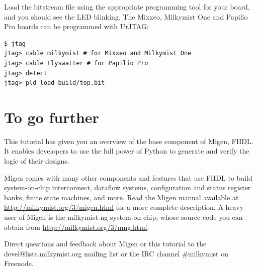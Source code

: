 \documentclass[11pt]{paper}
\begin{document}
Load the bitstream file using the appropriate programming tool for your board, and you should see the LED blinking. The Mixxeo, Milkymist One and Papilio Pro boards can be programmed with UrJTAG:

\begin{verbatim}
$ jtag
jtag> cable milkymist # for Mixxeo and Milkymist One
jtag> cable Flyswatter # for Papilio Pro
jtag> detect
jtag> pld load build/top.bit
\end{verbatim}

\section{To go further}
This tutorial has given you an overview of the base component of Migen, FHDL. It enables developers to use the full power of Python to generate and verify the logic of their designs.

Migen comes with many other components and features that use FHDL to build system-on-chip interconnect, dataflow systems, configuration and status register banks, finite state machines, and more. Read the Migen manual available at \url{http://milkymist.org/3/migen.html} for a more complete description. A heavy user of Migen is the milkymist-ng system-on-chip, whose source code you can obtain from \url{http://milkymist.org/3/mng.html}.

Direct questions and feedback about Migen or this tutorial to the devel@lists.milkymist.org mailing list or the IRC channel \#milkymist on Freenode.
\end{document}
